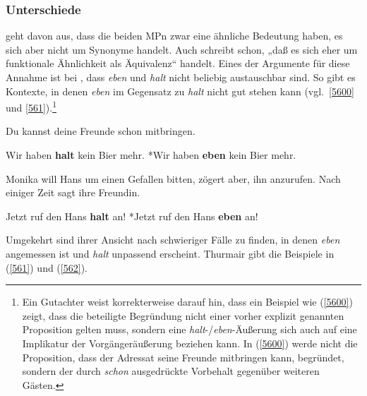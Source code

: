 \subsubsection{Unterschiede}
\label{sec:untersch}
\citet[124]{Thurmair1989} geht davon aus, dass die beiden MPn zwar eine ähnliche Bedeutung haben, es sich aber nicht um Synonyme handelt. Auch \citet[254]{Dahl1988} schreibt schon, „daß es sich eher um funktionale Ähnlichkeit als Äquivalenz“  handelt. Eines der Argumente für diese Annahme ist bei \citet{Thurmair1989}, dass \textit{eben} und \textit{halt} nicht beliebig austauschbar sind. So gibt es Kontexte, in denen \textit{eben} im Gegensatz zu \textit{halt} nicht gut stehen kann (vgl.\ \ref{5600} und \ref{561}).\footnote{Ein Gutachter weist korrekterweise darauf hin, dass ein Beispiel wie (\ref{5600}) zeigt, dass die beteiligte Begründung nicht einer vorher explizit genannten Proposition gelten muss, sondern eine \textit{halt}-/\textit{eben}-Äußerung sich auch auf eine Implikatur der Vorgängeräußerung beziehen kann. In (\ref{5600}) werde nicht die Proposition, dass der Adressat seine Freunde mitbringen kann, begründet, sondern der durch \textit{schon} ausgedrückte Vorbehalt gegenüber weiteren Gästen.}

\begin{exe}
	\ex\label{5600} Du kannst deine Freunde schon mitbringen.
		\begin{xlist}	
			\ex\label{5600a} Wir haben \textbf{halt} kein Bier mehr.
			\ex\label{5600b} *Wir haben \textbf{eben} kein Bier mehr.
		\end{xlist}
\end{exe}

\begin{exe}
	\ex\label{560} Monika will Hans um einen Gefallen bitten, zögert aber, ihn anzurufen. Nach einiger Zeit sagt ihre Freundin.
		\begin{xlist}	
			\ex\label{560a} Jetzt ruf den Hans \textbf{halt} an!
			\ex\label{560b} *Jetzt ruf den Hans \textbf{eben} an!
			\hfill\hbox{\citet[124]{Thurmair1989}}
		\end{xlist}
\end{exe}
Umgekehrt sind ihrer Ansicht nach schwieriger Fälle zu finden, in denen \textit{eben} angemessen ist und \textit{halt} unpassend erscheint. Thurmair gibt die Beispiele in (\ref{561}) und (\ref{562}).

